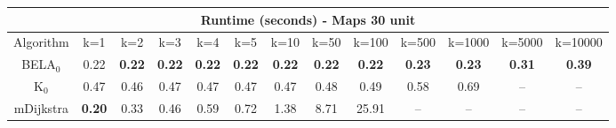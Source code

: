 \begin{tabular}{c|cccccccccccc}\toprule
\multicolumn{13}{c}{Runtime (seconds) - Maps 30 unit}\\ \midrule
Algorithm & k=1 & k=2 & k=3 & k=4 & k=5 & k=10 & k=50 & k=100 & k=500 & k=1000 & k=5000 & k=10000 \\ \midrule
BELA$_0$ & 0.22 & \textbf{0.22} & \textbf{0.22} & \textbf{0.22} & \textbf{0.22} & \textbf{0.22} & \textbf{0.22} & \textbf{0.22} & \textbf{0.23} & \textbf{0.23} & \textbf{0.31} & \textbf{0.39} \\
K$_0$ & 0.47 & 0.46 & 0.47 & 0.47 & 0.47 & 0.47 & 0.48 & 0.49 & 0.58 & 0.69 & -- & -- \\
mDijkstra & \textbf{0.20} & 0.33 & 0.46 & 0.59 & 0.72 & 1.38 & 8.71 & 25.91 & -- & -- & -- & -- \\ \bottomrule 
\end{tabular}
